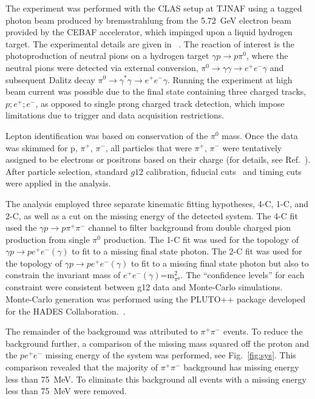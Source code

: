 \documentclass[aps,prc,twocolumn,floatfix,showpacs,preprintnumbers,amsmath,amssymb,superscriptaddress]{revtex4-1}
\begin{document}
The experiment was performed with the CLAS setup 
at TJNAF using a tagged photon beam produced by bremsstrahlung 
from the 5.72~GeV electron beam provided by the CEBAF accelerator, which impinged upon a 
liquid hydrogen target. The experimental details are given 
in ~\cite{g12}. The reaction of interest is the photoproduction 
of neutral pions on a hydrogen target $\gamma p\to p\pi^0$, where
the neutral pions were detected via external conversion, $\pi^0 \rightarrow \gamma \gamma \rightarrow e^+e^-\gamma$ and subsequent Dalitz decay $\pi^0\to \gamma^\ast
\gamma\to e^+e^-\gamma$. 
Running the experiment at high beam current was possible due to the final state containing three charged tracks, $p;e^+;e^-$, as opposed to single prong charged track detection, which impose limitations due to trigger and data acquisition restrictions.

Lepton identification was based on conservation of the $\pi^0$ mass. Once 
the data was skimmed for p, $\pi^+$, $\pi^-$, all particles that 
were $\pi^+$, $\pi^-$ were tentatively assigned to be electrons 
or positrons based on their charge (for details, see 
Ref.~\cite{Kunkel}).  After particle selection, standard $g12$ 
calibration, fiducial cuts~\cite{g12} and timing cuts were 
applied in the analysis.

The analysis employed three separate kinematic fitting 
hypotheses, 4-C, 1-C, and 2-C, as well as a cut on the missing 
energy of the detected system. The 4-C fit used the $\gamma p\to 
p\pi^+\pi^-$ channel to filter background from double charged 
pion production from single $\pi^0$ production. The 1-C fit
was used for the topology of $\gamma p\to pe^+e^-(\gamma)$ to 
fit to a missing final state photon.  The 2-C fit was used for 
the topology of $\gamma p\to pe^+e^-(\gamma)$ to fit to a 
missing final state photon but also to constrain the invariant 
mass of $e^+e^-(\gamma)$=m$^2_{\pi^0}$. The ``confidence levels''
for each constraint were consistent between g12 data 
and Monte-Carlo simulations. Monte-Carlo generation was performed 
using the PLUTO++ package developed for the HADES Collaboration.~\cite{PLUTO}.

The remainder of the background was attributed to $\pi^+\pi^-$
events. To reduce the background further, a comparison of the missing mass squared off the proton and the $pe^+e^-$ missing energy of the system was 
performed, see Fig.~\ref{fig:sys}. This comparison revealed that the majority of
$\pi^+\pi^-$ background has missing energy less than 75~MeV. 
To eliminate this background all events with a missing energy 
less than 75~MeV were removed.
\end{document}
